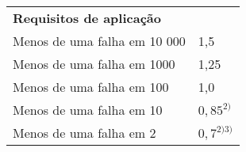 \begin{table}
\centering
{}
\begin{tabular}{ll}
\textbf{Requisitos de aplicação}      & \textbf{$Y_Z \\ ^{1)}$ {   \\
Menos de uma falha em 10 000 & 1,5       \\
Menos de uma falha em 1000   & 1,25      \\
Menos de uma falha em 100    & 1,0       \\
Menos de uma falha em 10     & $0,85 ^{2)}$   \\
Menos de uma falha em 2      & $0,7^{2) 3)}$
\end{tabular}
\end{table}